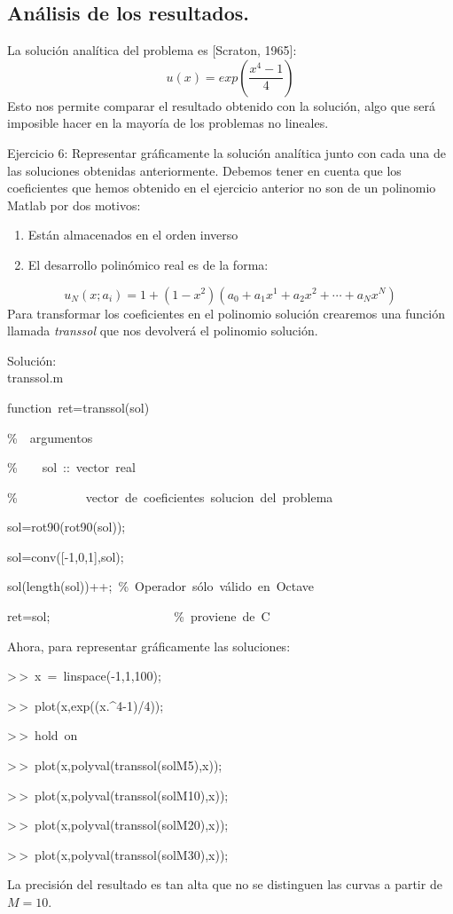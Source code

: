 \subsection{Análisis de los resultados.}

La solución analítica del problema es {[}Scraton, 1965]:\[
u(x)=exp\left(\frac{x^{4}-1}{4}\right)\]
Esto nos permite comparar el resultado obtenido con la solución, algo
que será imposible hacer en la mayoría de los problemas no lineales.

\lyxline{\normalsize}

Ejercicio 6: Representar gráficamente la solución analítica junto
con cada una de las soluciones obtenidas anteriormente. Debemos tener
en cuenta que los coeficientes que hemos obtenido en el ejercicio
anterior no son de un polinomio Matlab por dos motivos:

\begin{enumerate}
\item Están almacenados en el orden inverso
\item El desarrollo polinómico real es de la forma:
\end{enumerate}
\[
u_{N}(x;a_{i})=1+(1-x^{2})(a_{0}+a_{1}x^{1}+a_{2}x^{2}+\cdots+a_{N}x^{N})\]
Para transformar los coeficientes en el polinomio solución crearemos
una función llamada \emph{transsol} que nos devolverá el polinomio
solución.

Solución:\\
transsol.m

\begin{lyxcode}
function~ret=transsol(sol)

\%~~argumentos

\%~~~~sol~::~vector~real

\%~~~~~~~~~~~vector~de~coeficientes~solucion~del~problema

sol=rot90(rot90(sol));

sol=conv({[}-1,0,1],sol);

sol(length(sol))++;~\%~Operador~sólo~válido~en~Octave

ret=sol;~~~~~~~~~~~~~~~~~~~~\%~proviene~de~C
\end{lyxcode}
Ahora, para representar gráficamente las soluciones:

\begin{lyxcode}
>\,{}>~x~=~linspace(-1,1,100);

>\,{}>~plot(x,exp((x.\textasciicircum{}4-1)/4));

>\,{}>~hold~on

>\,{}>~plot(x,polyval(transsol(solM5),x));

>\,{}>~plot(x,polyval(transsol(solM10),x));

>\,{}>~plot(x,polyval(transsol(solM20),x));

>\,{}>~plot(x,polyval(transsol(solM30),x));
\end{lyxcode}
La precisión del resultado es tan alta que no se distinguen las curvas
a partir de $M=10$.


